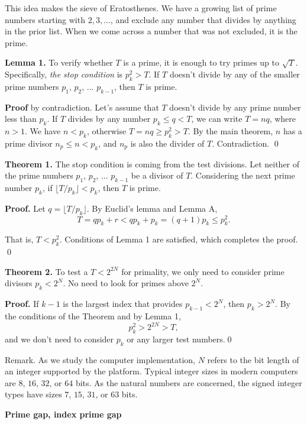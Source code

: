 This idea makes the sieve of Eratosthenes. We have a growing list of prime numbers starting with $2, 3, \dots$,
and exclude any number that divides by anything in the prior list. When we come across a number that
was not excluded, it is the prime.

\smallvskip

{\bf Lemma 1.} To verify whether $T$ is a prime, it is enough to try primes up to $\sqrt{T}$.
Specifically, {\it the stop condition\/} is $p_k^2>T$. If $T$ doesn't divide by any of the smaller
prime numbers $p_1$, $p_2$, ... $p_{k-1}$, then $T$ is prime.

{\bf Proof\/} by contradiction. Let's assume that $T$ doesn't divide by any prime number less than $p_k$.
If $T$ divides by any number $p_k \le q < T$, we can write $T=nq$, where
$n>1$. We have $n<p_k$, otherwise $T = nq \ge p_k^2 > T$. By the main theorem, $n$ has
a prime divisor $n_p \le n < p_k$, and $n_p$ is also the divider of $T$. Contradiction. \qed

\smallvskip

{\bf Theorem 1.} The stop condition is coming from the test divisions.
Let neither of the prime numbers $p_1$, $p_2$, ... $p_{k-1}$ be a divisor of $T$.
Considering the next prime number $p_k$, if $\lfloor T/p_k \rfloor < p_k$, then $T$ is prime.

{\bf Proof.\/} Let $q = \lfloor T/p_k \rfloor$. By Euclid's lemma and Lemma A,
$$
T = q p_k + r < q p_k + p_k = (q+1) p_k \le p_k^2.
$$

That is, $T < p_k^2$. Conditions of Lemma 1 are satisfied, which completes the proof. \qed

\smallvskip

{\bf Theorem 2.} To test a $T<2^{2N}$ for primality, we only need to consider prime divisors $p_k<2^N$.
No need to look for primes above $2^N$.

{\bf Proof.\/} 
If $k-1$ is the largest index that provides $p_{k-1}<2^N$, then $p_k>2^N$. By the conditions of the Theorem
and by Lemma 1,
$$
p_k^2 > 2^{2N} > T,
$$
and we don't need to consider $p_k$ or any larger test numbers.\qed

Remark. As we study the computer implementation, $N$ refers to the bit length of an integer supported by the platform.
Typical integer sizes in modern computers are $8$, $16$, $32$, or $64$ bits. As the natural numbers are concerned,
the signed integer types have sizes $7$, $15$, $31$, or $63$ bits.

\vfil\break

{\bf Prime gap, index prime gap}
\bigvskip



\bye
